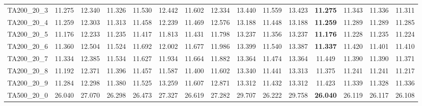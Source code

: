 \begin{tabular}{cc||ccccccccccccc}
TA200\_20\_3       & 11.275           & 12.340           & 11.326           & 11.530           & 12.442           & 11.602           & 12.334           & 13.440           & 11.559           & 13.423           & {\bf 11.275}     & 11.343           & 11.336           & 11.311          \\ 
TA200\_20\_4       & 11.259           & 12.303           & 11.313           & 11.458           & 12.239           & 11.469           & 12.576           & 13.188           & 11.448           & 13.188           & {\bf 11.259}     & 11.289           & 11.289           & 11.285          \\ 
TA200\_20\_5       & 11.176           & 12.233           & 11.235           & 11.417           & 11.813           & 11.431           & 11.798           & 13.237           & 11.356           & 13.237           & {\bf 11.176}     & 11.228           & 11.235           & 11.224          \\ 
TA200\_20\_6       & 11.360           & 12.504           & 11.524           & 11.692           & 12.002           & 11.677           & 11.986           & 13.399           & 11.540           & 13.387           & {\bf 11.337}     & 11.420           & 11.401           & 11.410          \\ 
TA200\_20\_7       & 11.334           & 12.385           & 11.534           & 11.627           & 11.934           & 11.664           & 11.882           & 13.364           & 11.474           & 13.364           & 11.449           & 11.390           & 11.390           & 11.371          \\ 
TA200\_20\_8       & 11.192           & 12.371           & 11.396           & 11.457           & 11.587           & 11.400           & 11.602           & 13.340           & 11.441           & 13.313           & 11.375           & 11.241           & 11.241           & 11.217          \\ 
TA200\_20\_9       & 11.284           & 12.298           & 11.380           & 11.525           & 13.259           & 11.607           & 12.871           & 13.312           & 11.432           & 13.312           & 11.423           & 11.339           & 11.328           & 11.336          \\ 
TA500\_20\_0       & 26.040           & 27.070           & 26.298           & 26.473           & 27.327           & 26.619           & 27.282           & 29.707           & 26.222           & 29.758           & {\bf 26.040}     & 26.119           & 26.117           & 26.108          \\ 

\end{tabular}
